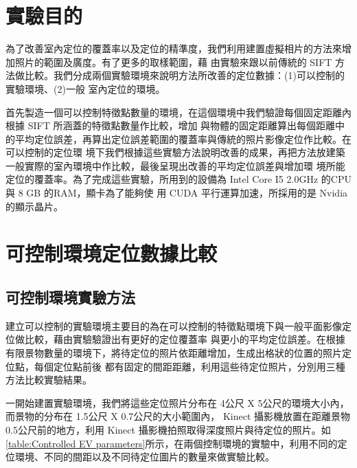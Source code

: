 

\section{實驗目的}
	
	為了改善室內定位的覆蓋率以及定位的精準度，我們利用建置虛擬相片的方法來增加照片的範圍及廣度。有了更多的取樣範圍，藉
由實驗來跟以前傳統的 SIFT 方法做比較。我們分成兩個實驗環境來說明方法所改善的定位數據：(1)可以控制的實驗環境、(2)一般
室內定位的環境。

	首先製造一個可以控制特徵點數量的環境，在這個環境中我們驗證每個固定距離內根據 SIFT 所涵蓋的特徵點數量作比較，增加
與物體的固定距離算出每個距離中的平均定位誤差，再算出定位誤差範圍的覆蓋率與傳統的照片影像定位作比較。在可以控制的定位環
境下我們根據這些實驗方法說明改善的成果，再把方法放建築一般實際的室內環境中作比較，最後呈現出改善的平均定位誤差與增加環
境所能定位的覆蓋率。為了完成這些實驗，所用到的設備為  Intel Core I5 2.0GHz 的CPU與 8 GB 的RAM，顯卡為了能夠使
用 CUDA 平行運算加速，所採用的是 Nvidia 的顯示晶片。

\section{可控制環境定位數據比較}


\subsection{可控制環境實驗方法}
	建立可以控制的實驗環境主要目的為在可以控制的特徵點環境下與一般平面影像定位做比較，藉由實驗驗證出有更好的定位覆蓋率
與更小的平均定位誤差。在根據有限景物數量的環境下，將待定位的照片依距離增加，生成出格狀的位置的照片定位點，每個定位點前後
都有固定的間距距離，利用這些待定位照片，分別用三種方法比較實驗結果。

	一開始建置實驗環境，我們將這些定位照片分布在 4公尺 X 5公尺的環境大小內，而景物的分布在 1.5公尺 X 0.7公尺的大小範圍內， 
Kinect 攝影機放置在距離景物 0.5公尺前的地方，利用 Kinect 攝影機拍照取得深度照片與待定位的照片。如\ref{table:Controlled 
EV parameters}所示，在兩個控制環境的實驗中，利用不同的定位環境、不同的間距以及不同待定位圖片的數量來做實驗比較。
		


